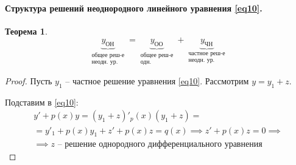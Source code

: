 \documentclass[11pt,a4paper,oneside]{report}
\theoremstyle{definition}
\theoremstyle{plain}
\newtheorem{theorem}{Теорема}[section]
\theoremstyle{remark}
\begin{document}
\paragraph*{Структура решений неоднородного линейного уравнения \ref{eq10}.}

\begin{theorem}
    \begin{equation*}
        \underbrace{y_\text{ОН}}_{\begin{array}{c}
                \text{общее реш-е} \\
                \text{неодн. ур.}
            \end{array}} = \underbrace{y_\text{ОО}}_{\begin{array}{c}
                \text{общее реш-е} \\
                \text{одн.}
            \end{array}} + \underbrace{y_\text{ЧН}}_{\begin{array}{c}
                \text{частное реш-е} \\
                \text{неодн. ур.}
            \end{array}}
    \end{equation*}
\end{theorem}

\begin{proof}
    Пусть $y_1$ -- частное решение уравнения \ref{eq10}. Рассмотрим $y = y_1 + z$.

    Подставим в \ref{eq10}:
    \begin{multline*}
        y' + p(x)y = (y_1 + z)' _ p(x)(y_1 + z) =\\
        = y'_1 + p(x)y_1 + z' + p(x)z = q(x) \implies z'+ p(x)z = 0 \implies \\
        \implies z\text{ -- решение однородного дифференциального уравнения}
    \end{multline*}
\end{proof}
\end{document}
